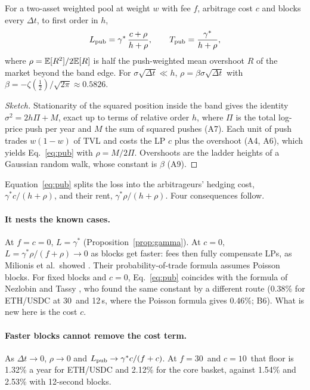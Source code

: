 \begin{prop}\label{prop:pub}
For a two-asset weighted pool at weight $w$ with fee $f$, arbitrage cost $c$ and blocks every $\Delta t$, to first order in $h$,
\begin{equation}
L_{\mathrm{pub}}=\gamma^{*}\,\frac{c+\rho}{h+\rho},\qquad T_{\mathrm{pub}}=\frac{\gamma^{*}}{h+\rho},
\label{eq:pub}
\end{equation}
where $\rho=\mathbb{E}[R^2]/2\mathbb{E}[R]$ is half the push-weighted mean overshoot $R$ of the market beyond the band edge. For $\sigma\sqrt{\Delta t}\ll h$, $\rho=\beta\sigma\sqrt{\Delta t}$ with $\beta=-\zeta(\tfrac12)/\sqrt{2\pi}\approx0.5826$.
\end{prop}
\begin{proof}[Sketch]
Stationarity of the squared position inside the band gives the identity $\sigma^2=2h\Pi+M$, exact up to terms of relative order $h$, where $\Pi$ is the total log-price push per year and $M$ the sum of squared pushes (A7). Each unit of push trades $w(1-w)$ of TVL and costs the LP $c$ plus the overshoot (A4, A6), which yields Eq.~\eqref{eq:pub} with $\rho=M/2\Pi$. Overshoots are the ladder heights of a Gaussian random walk, whose constant is $\beta$ \cite{siegmund,bgk,nt} (A9).
\end{proof}

Equation~\eqref{eq:pub} splits the loss into the arbitrageurs' hedging cost, $\gamma^{*}c/(h+\rho)$, and their rent, $\gamma^{*}\rho/(h+\rho)$. Four consequences follow.

\paragraph{It nests the known cases.} At $f=c=0$, $L=\gamma^{*}$ (Proposition~\ref{prop:gamma}). At $c=0$, $L=\gamma^{*}\rho/(f+\rho)\to0$ as blocks get faster: fees then fully compensate LPs, as Milionis et al.\ showed \cite{lvrfees}. Their probability-of-trade formula assumes Poisson blocks. For fixed blocks and $c=0$, Eq.~\eqref{eq:pub} coincides with the formula of Nezlobin and Tassy \cite{nt}, who found the same constant by a different route (0.38\% for ETH/USDC at 30\bps\ and 12\,s, where the Poisson formula gives 0.46\%; B6). What is new here is the cost $c$.

\paragraph{Faster blocks cannot remove the cost term.} As $\Delta t\to0$, $\rho\to0$ and $L_{\mathrm{pub}}\to\gamma^{*}c/(f+c)$. At $f=30$\bps\ and $c=10$\bps\ that floor is 1.32\% a year for ETH/USDC and 2.12\% for the core basket, against 1.54\% and 2.53\% with 12-second blocks.

